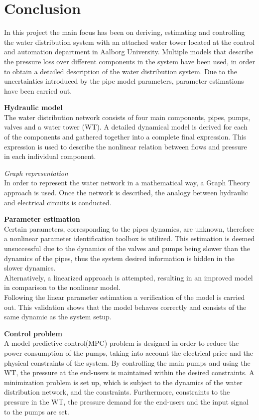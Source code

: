 \chapter{Conclusion}
\label{Conclusion}

In this project the main focus has been on deriving, estimating and controlling the water distribution system with an attached water tower located at the control and automation department in Aalborg University. Multiple models that describe the pressure loss over different components in the system have been used, in order to obtain a detailed description of the water distribution system. Due to the uncertainties introduced by the pipe model parameters, parameter estimations have been carried out. 

\textbf{Hydraulic model}\\
The water distribution network consists of four main components, pipes, pumps, valves and a  water tower (WT). A detailed dynamical model is derived for each of the components and gathered together into a complete final expression. This expression is used to describe the nonlinear relation between flows and pressure in each individual component.

\textit{Graph representation}\\
In order to represent the water network in a mathematical way, a Graph Theory approach is used. Once the network is described, the analogy between hydraulic and electrical circuits is conducted. 

\textbf{Parameter estimation}\\
Certain parameters, corresponding to the pipes dynamics, are unknown, therefore a nonlinear parameter identification toolbox is utilized. This estimation is deemed unsuccessful due to the dynamics of the valves and pumps being slower than the dynamics of the pipes, thus the system desired information is hidden in the slower dynamics.\\
Alternatively, a linearized approach is attempted, resulting in an improved model in comparison to the nonlinear model.\\
Following the linear parameter estimation a verification of the model is carried out. This validation shows that the model behaves correctly and consists of the same dynamic as the system setup.  

\textbf{Control problem}\\
A model predictive control(MPC) problem is designed in order to reduce the power consumption of the pumps, taking into account the electrical price and the physical constraints of the system. By controlling the main pumps and using the WT, the pressure at the end-users is maintained within the desired constraints. A minimization problem is set up, which is subject to the dynamics of the water distribution network, and the constraints. Furthermore, constraints to the pressure in the WT, the pressure demand for the end-users and the input signal to the pumps are set.

